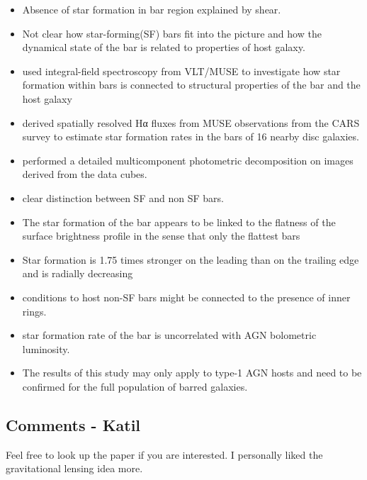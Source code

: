\documentclass{article}
\begin{document}
\begin{itemize}
    \item Absence of star formation in bar region explained by shear.
    \item Not clear how star-forming(SF) bars fit into the picture and how the dynamical state of the bar is related to properties of host galaxy.
    \item used integral-field spectroscopy from VLT/MUSE to investigate how star formation within bars is connected to structural properties of the bar and the host galaxy
    \item derived spatially resolved Hα fluxes from MUSE observations from the CARS survey to estimate star formation rates in the bars of 16 nearby disc galaxies.
    \item performed a detailed multicomponent photometric decomposition on images derived from the data cubes.
    \item clear distinction between SF and non SF bars.
    \item The star formation of the bar appears to be linked to the flatness of the surface brightness profile in the sense that only the flattest bars
    \item Star formation is 1.75 times stronger on the leading than on the trailing edge and is radially decreasing
    \item conditions to host non-SF bars might be connected to the presence of inner rings.
    \item  star formation rate of the bar is uncorrelated with AGN bolometric luminosity.
    \item The results of this study may only apply to type-1 AGN hosts and need to be confirmed for the full population of barred galaxies.
\end{itemize}

\subsection{Comments - Katil}

Feel free to look up the paper if you are interested. I personally liked the gravitational lensing idea more.
\end{document}
